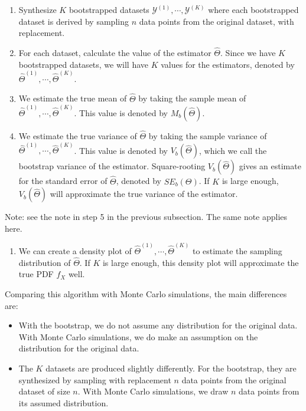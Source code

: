 \documentclass[
]{book}
\providecommand{\tightlist}{%
  \setlength{\itemsep}{0pt}\setlength{\parskip}{0pt}}
\begin{document}
\begin{enumerate}
\def\labelenumi{\arabic{enumi}.}
\item
  Synthesize \(K\) bootstrapped datasets \(\mathcal{Y}^{(1)}, \cdots, \mathcal{Y}^{(K)}\) where each bootstrapped dataset is derived by sampling \(n\) data points from the original dataset, with replacement.
\item
  For each dataset, calculate the value of the estimator \(\hat{\Theta}\). Since we have \(K\) bootstrapped datasets, we will have \(K\) values for the estimators, denoted by \(\hat{\Theta}^{(1)}, \cdots, \hat{\Theta}^{(K)}\).
\item
  We estimate the true mean of \(\hat{\Theta}\) by taking the sample mean of \(\hat{\Theta}^{(1)}, \cdots, \hat{\Theta}^{(K)}\). This value is denoted by \(M_b(\hat{\Theta})\).
\item
  We estimate the true variance of \(\hat{\Theta}\) by taking the sample variance of \(\hat{\Theta}^{(1)}, \cdots, \hat{\Theta}^{(K)}\). This value is denoted by \(V_b(\hat{\Theta})\), which we call the bootstrap variance of the estimator. Square-rooting \(V_b(\hat{\Theta})\) gives an estimate for the standard error of \(\hat{\Theta}\), denoted by \(SE_b(\Theta)\). If \(K\) is large enough, \(V_b(\hat{\Theta})\) will approximate the true variance of the estimator.
\end{enumerate}

Note: see the note in step 5 in the previous subsection. The same note applies here.

\begin{enumerate}
\def\labelenumi{\arabic{enumi}.}
\setcounter{enumi}{4}
\tightlist
\item
  We can create a density plot of \(\hat{\Theta}^{(1)}, \cdots, \hat{\Theta}^{(K)}\) to estimate the sampling distribution of \(\hat{\Theta}\). If \(K\) is large enough, this density plot will approximate the true PDF \(f_X\) well.
\end{enumerate}

Comparing this algorithm with Monte Carlo simulations, the main differences are:

\begin{itemize}
\item
  With the bootstrap, we do not assume any distribution for the original data. With Monte Carlo simulations, we do make an assumption on the distribution for the original data.
\item
  The \(K\) datasets are produced slightly differently. For the bootstrap, they are synthesized by sampling with replacement \(n\) data points from the original dataset of size \(n\). With Monte Carlo simulations, we draw \(n\) data points from its assumed distribution.
\end{itemize}
\end{document}
